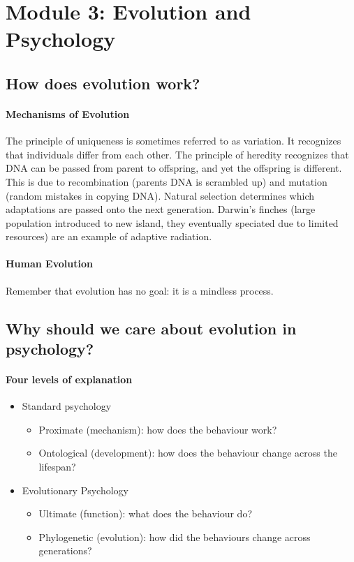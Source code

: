 \documentclass[10pt,letter]{article}
\theoremstyle{plain}
\theoremstyle{definition}
\begin{document}
\section*{Module 3: Evolution and Psychology}
\subsection*{How does evolution work?}
\paragraph{Mechanisms of Evolution}
The principle of uniqueness is sometimes referred to as variation. It recognizes that individuals differ from each other. The principle of heredity recognizes that DNA can be passed from parent to offspring, and yet the offspring is different. This is due to recombination (parents DNA is scrambled up) and mutation (random mistakes in copying DNA). Natural selection determines which adaptations are passed onto the next generation. Darwin's finches (large population introduced to new island, they eventually speciated due to limited resources) are an example of adaptive radiation. 

\paragraph{Human Evolution}
Remember that evolution has no goal: it is a mindless process. 


\subsection*{Why should we care about evolution in psychology?}
\paragraph{Four levels of explanation}
\begin{itemize}
    \item Standard psychology
    \begin{itemize}
        \item Proximate (mechanism): how does the behaviour work? 
        \item Ontological (development): how does the behaviour change across the lifespan?
    \end{itemize}
    \item Evolutionary Psychology
    \begin{itemize}
        \item Ultimate (function): what does the behaviour do? 
        \item Phylogenetic (evolution): how did the behaviours change across generations?
    \end{itemize}
\end{itemize}
\end{document}
